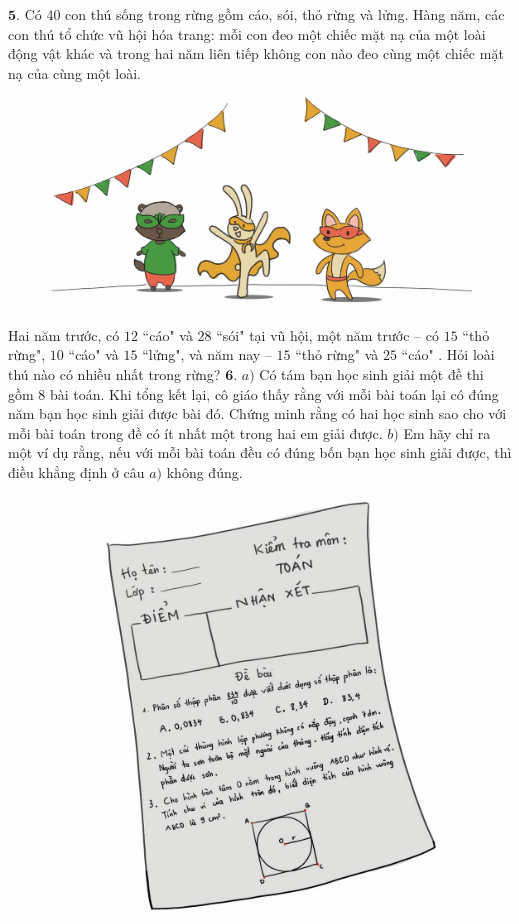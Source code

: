 \begin{multicols}{2}
\begin{figure}[H]
		\vspace*{-20pt}
	\end{figure}
	$\pmb{5.}$ Có $40$ con thú sống trong rừng gồm cáo, sói, thỏ rừng và lửng. Hàng năm, các con thú tổ chức vũ hội hóa trang: mỗi con đeo một chiếc mặt nạ của một loài động vật khác và trong hai năm liên tiếp không con nào đeo cùng một chiếc mặt nạ của cùng một loài.
	\begin{figure}[H]
		\centering
		\vspace*{-5pt}
		\captionsetup{labelformat= empty, justification=centering}
		\includegraphics[width=1\linewidth]{Pi4_bai5}
		\vspace*{-20pt}
	\end{figure}
	Hai năm trước, có $12$ ``cáo" và $28$ ``sói" tại vũ hội, một năm trước -- có $15$ ``thỏ rừng", $10$ ``cáo" và $15$ ``lửng", và năm nay -- $15$ ``thỏ rừng" và $25$ ``cáo" . Hỏi loài thú nào có nhiều nhất trong rừng? 
	\vskip 0.1cm
	$\pmb{6.}$ $a)$	Có tám bạn học sinh giải một đề thi gồm $8$ bài toán. Khi tổng kết lại, cô giáo thấy rằng với mỗi bài toán lại có đúng  năm bạn học sinh giải được bài đó. Chứng minh rằng có hai học sinh sao cho với mỗi bài toán trong đề có ít nhất một trong hai em giải được.
	\vskip 0.1cm
	$b)$	Em hãy chỉ ra một ví dụ rằng, nếu với mỗi bài toán đều có đúng bốn bạn học sinh giải được, thì điều khẳng định ở câu $a)$ không đúng.
	\begin{figure}[H]
		\centering
		\vspace*{-10pt}
		\captionsetup{labelformat= empty, justification=centering}
		\includegraphics[width=0.7\linewidth]{Pi4_bai6}
		\vspace*{-5pt}
	\end{figure}
\end{multicols}
